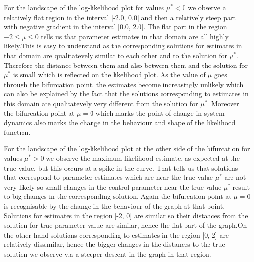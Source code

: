 \documentclass[12pt,a4paper,titlepage]{article}
\begin{document}
For the landscape of the log-likelihood plot for values $\mu^* < 0$ we observe a relatively flat region in the interval [-2.0, 0.0] and then a relatively steep part with negative gradient in the interval [0.0, 2.0]. The flat part in the region $-2 \le \mu \le 0$ tells us that parameter estimates in that domain are all highly likely.This is easy to understand as the corresponding solutions for estimates in that domain  are qualitatevely similar to each other and to the solution for $\mu^*$. Therefore the distance between them and also between them and the solution for $\mu^*$ is small which is reflected on the likelihood plot. As the value of $\mu$ goes through the bifurcation point, the estimates become increasingly unlikely which can also be explained by the fact that the solutions corresponding to estimates in this domain are qualitatevely very different from the solution for $\mu^*$. Moreover the bifurcation point at $\mu = 0$ which marks the point of change in system dynamics also marks the change in the behaviour and shape of the likelihood function.

For the landscape of the log-likelihood plot at the other side of the bifurcation for values $\mu^* > 0$ we observe the maximum likelihood estimate, as expected at the true value, but this occurs at a spike in the curve. That tells us that solutions that correspond to parameter estimates which are near the true value $\mu^*$ are not very likely so small changes in the control parameter near the true value $\mu^*$ result to big changes in the corresponding solution. Again the bifurcation point at $\mu=0$ is recognisable by the change in the behaviour of the graph at that point. Solutions for estimates in the region [-2, 0] are similar so their distances from the solution for true parameter value are similar, hence the flat part of the graph.On the other hand solutions corresponding to estimates in the region [0, 2] are relatively dissimilar, hence the bigger changes in the distances to the true solution we observe via a steeper descent in the graph in that region.
\end{document}
